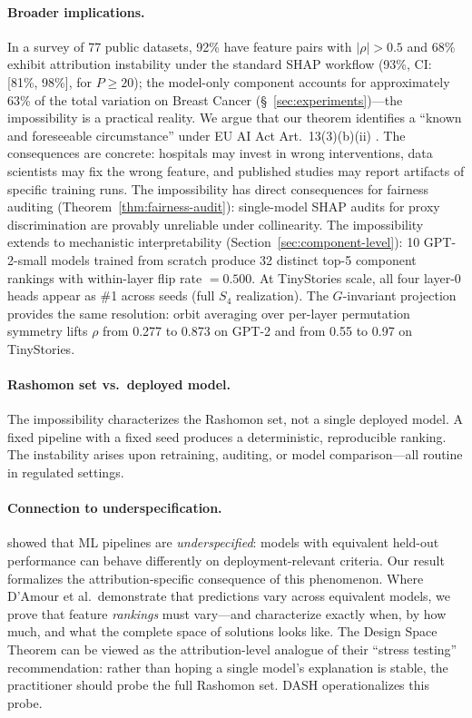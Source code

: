 \documentclass{jmlr}
\begin{document}
\paragraph{Broader implications.}
In a survey of 77 public datasets, 92\% have feature pairs with $|\rho| > 0.5$ and 68\% exhibit attribution instability under the standard SHAP workflow (93\%, CI: [81\%, 98\%], for $P \geq 20$); the model-only component accounts for approximately 63\% of the total variation on Breast Cancer (\S~\ref{sec:experiments})---the impossibility is a practical reality. We argue that our theorem identifies a ``known and foreseeable circumstance'' under EU AI Act Art.~13(3)(b)(ii) \citep{euaiact2024}.
The consequences are concrete: hospitals may invest in wrong interventions, data scientists may fix the wrong feature, and published studies may report artifacts of specific training runs.
The impossibility has direct consequences for fairness auditing (Theorem~\ref{thm:fairness-audit}): single-model SHAP audits for proxy discrimination are provably unreliable under collinearity.
The impossibility extends to mechanistic interpretability (Section~\ref{sec:component-level}): 10 GPT-2-small models trained from scratch produce 32 distinct top-5 component rankings with within-layer flip rate $= 0.500$. At TinyStories scale, all four layer-0 heads appear as \#1 across seeds (full $S_4$ realization). The $G$-invariant projection provides the same resolution: orbit averaging over per-layer permutation symmetry lifts $\rho$ from 0.277 to 0.873 on GPT-2 and from 0.55 to 0.97 on TinyStories.

\paragraph{Rashomon set vs.\ deployed model.}
The impossibility characterizes the Rashomon set, not a single deployed model. A fixed pipeline with a fixed seed produces a deterministic, reproducible ranking. The instability arises upon retraining, auditing, or model comparison---all routine in regulated settings.

\paragraph{Connection to underspecification.}
\citet{damour2022underspecification} showed that ML pipelines are \emph{underspecified}: models with equivalent held-out performance can behave differently on deployment-relevant criteria. Our result formalizes the attribution-specific consequence of this phenomenon. Where D'Amour et al.\ demonstrate that predictions vary across equivalent models, we prove that feature \emph{rankings} must vary---and characterize exactly when, by how much, and what the complete space of solutions looks like. The Design Space Theorem can be viewed as the attribution-level analogue of their ``stress testing'' recommendation: rather than hoping a single model's explanation is stable, the practitioner should probe the full Rashomon set. DASH operationalizes this probe.
\end{document}
